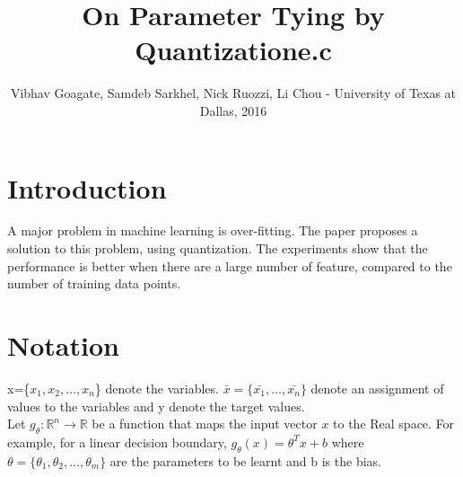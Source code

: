 \documentclass[conference]{IEEEtran}
\begin{document}
%
\title{On Parameter Tying by Quantizatione.c}
\author{Vibhav Goagate, Samdeb Sarkhel, Nick Ruozzi, Li Chou - University of Texas at Dallas, 2016}

\maketitle





%
\IEEEpeerreviewmaketitle



\section{Introduction}
A major problem in machine learning is over-fitting. The paper proposes a solution to this problem, using quantization. The experiments show that the performance is better when there are a large number of feature, compared to the number of training data points. 

\section{Notation}
x=\{$x_1,x_2, \dots ,x_n$\} denote the variables.
$\bar{x}=\{\bar{x_1},\dots,\bar{x_n}\}$ denote an assignment of values to the variables and y denote the target values.\\

Let $g_\theta:\mathbb{R}^n\rightarrow\mathbb{R}$ be a function that maps the input vector $x$ to the Real space. For example, for a linear decision boundary, $g_{\theta}(x)=\theta^{T}x + b$ where $\theta=\{\theta_1,\theta_2,\dots,\theta_m\}$ are the parameters to be learnt and b is the bias.\\
\end{document}
